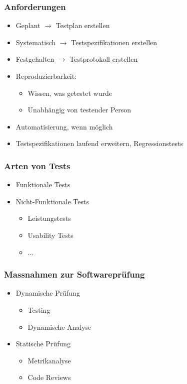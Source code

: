 \begin{multicols}{2}
\subsubsection{Anforderungen}
\begin{itemize}
	\item Geplant $\rightarrow$ Testplan erstellen
	\item Systematisch $\rightarrow$ Testspezifikationen erstellen
	\item Festgehalten $\rightarrow$ Testprotokoll erstellen
	\item Reproduzierbarkeit:
			\begin{itemize}
				\item Wissen, was getestet wurde
				\item Unabhängig von testender Person
			\end{itemize}
	\item Automatisierung, wenn möglich
	\item Testspezifikationen laufend erweitern, Regressionstests
\end{itemize}

\subsubsection{Arten von Tests}
\begin{itemize}
	\item Funktionale Tests
	\item Nicht-Funktionale Tests
			\begin{itemize}
				\item Leistungstests
				\item Usability Tests
				\item ...
			\end{itemize}
\end{itemize}

\subsubsection{Massnahmen zur Softwareprüfung}
\begin{itemize}
	\item Dynamische Prüfung
			\begin{itemize}
				\item Testing
				\item Dynamische Analyse
			\end{itemize}
	\item Statische Prüfung
			\begin{itemize}
				\item Metrikanalyse
				\item Code Reviews
			\end{itemize}
\end{itemize}


\end{multicols}
